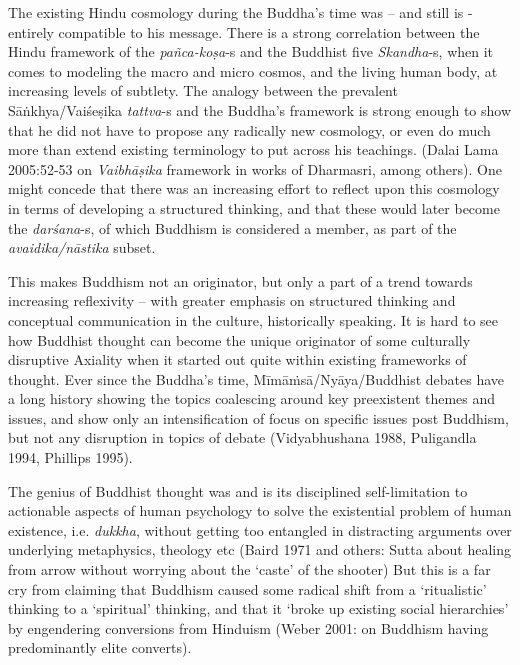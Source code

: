 The existing Hindu cosmology during the Buddha’s time was – and still is - entirely compatible to his message. There is a strong correlation between the Hindu framework of the \textit{pañca-koṣa}-s and the Buddhist five \textit{Skandha}-s, when it comes to modeling the macro and micro cosmos, and the living human body, at increasing levels of subtlety. The analogy between the prevalent Sāṅkhya/Vaiśeṣika \textit{tattva}-s and the Buddha’s framework is strong enough to show that he did not have to propose any radically new cosmology, or even do much more than extend existing terminology to put across his teachings. (Dalai Lama 2005:52-53 on \textit{Vaibhāṣika} framework in works of Dharmasri, among others). One might concede that there was an increasing effort to reflect upon this cosmology in terms of developing a structured thinking, and that these would later become the \textit{darśana}-s, of which Buddhism is considered a member, as part of the \textit{avaidika/nāstika} subset.

This makes Buddhism not an originator, but only a part of a trend towards increasing reflexivity – with greater emphasis on structured thinking and conceptual communication in the culture, historically speaking. It is hard to see how Buddhist thought can become the unique originator of some culturally disruptive Axiality when it started out quite within existing frameworks of thought. Ever since the Buddha’s time, Mīmāṁsā/Nyāya/Buddhist debates have a long history showing the topics coalescing around key preexistent themes and issues, and show only an intensification of focus on specific issues post Buddhism, but not any disruption in topics of debate (Vidyabhushana 1988, Puligandla 1994, Phillips 1995).

The genius of Buddhist thought was and is its disciplined self-limitation to actionable aspects of human psychology to solve the existential problem of human existence, i.e. \textit{dukkha}, without getting too entangled in distracting arguments over underlying metaphysics, theology etc (Baird 1971 and others: Sutta about healing from arrow without worrying about the ‘caste’ of the shooter) But this is a far cry from claiming that Buddhism caused some radical shift from a `ritualistic’ thinking to a ‘spiritual’ thinking, and that it ‘broke up existing social hierarchies’ by engendering conversions from Hinduism (Weber 2001: on Buddhism having predominantly elite converts).

